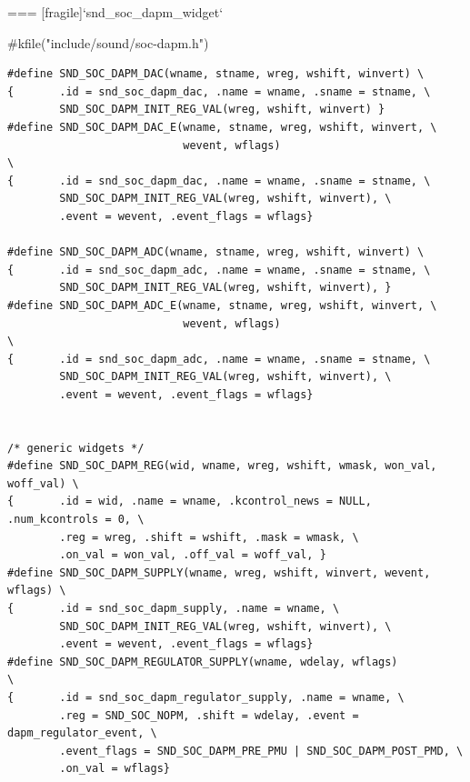 === [fragile]{`snd_soc_dapm_widget`}
  \begin{block}{#kfile("include/sound/soc-dapm.h")}
    \fontsize{8}{7}\selectfont
    \begin{verbatim}
#define SND_SOC_DAPM_DAC(wname, stname, wreg, wshift, winvert) \
{       .id = snd_soc_dapm_dac, .name = wname, .sname = stname, \
        SND_SOC_DAPM_INIT_REG_VAL(wreg, wshift, winvert) }
#define SND_SOC_DAPM_DAC_E(wname, stname, wreg, wshift, winvert, \
                           wevent, wflags)                                \
{       .id = snd_soc_dapm_dac, .name = wname, .sname = stname, \
        SND_SOC_DAPM_INIT_REG_VAL(wreg, wshift, winvert), \
        .event = wevent, .event_flags = wflags}

#define SND_SOC_DAPM_ADC(wname, stname, wreg, wshift, winvert) \
{       .id = snd_soc_dapm_adc, .name = wname, .sname = stname, \
        SND_SOC_DAPM_INIT_REG_VAL(wreg, wshift, winvert), }
#define SND_SOC_DAPM_ADC_E(wname, stname, wreg, wshift, winvert, \
                           wevent, wflags)                                \
{       .id = snd_soc_dapm_adc, .name = wname, .sname = stname, \
        SND_SOC_DAPM_INIT_REG_VAL(wreg, wshift, winvert), \
        .event = wevent, .event_flags = wflags}


/* generic widgets */
#define SND_SOC_DAPM_REG(wid, wname, wreg, wshift, wmask, won_val, woff_val) \
{       .id = wid, .name = wname, .kcontrol_news = NULL, .num_kcontrols = 0, \
        .reg = wreg, .shift = wshift, .mask = wmask, \
        .on_val = won_val, .off_val = woff_val, }
#define SND_SOC_DAPM_SUPPLY(wname, wreg, wshift, winvert, wevent, wflags) \
{       .id = snd_soc_dapm_supply, .name = wname, \
        SND_SOC_DAPM_INIT_REG_VAL(wreg, wshift, winvert), \
        .event = wevent, .event_flags = wflags}
#define SND_SOC_DAPM_REGULATOR_SUPPLY(wname, wdelay, wflags)            \
{       .id = snd_soc_dapm_regulator_supply, .name = wname, \
        .reg = SND_SOC_NOPM, .shift = wdelay, .event = dapm_regulator_event, \
        .event_flags = SND_SOC_DAPM_PRE_PMU | SND_SOC_DAPM_POST_PMD, \
        .on_val = wflags}
    \end{verbatim}
  \end{block}



